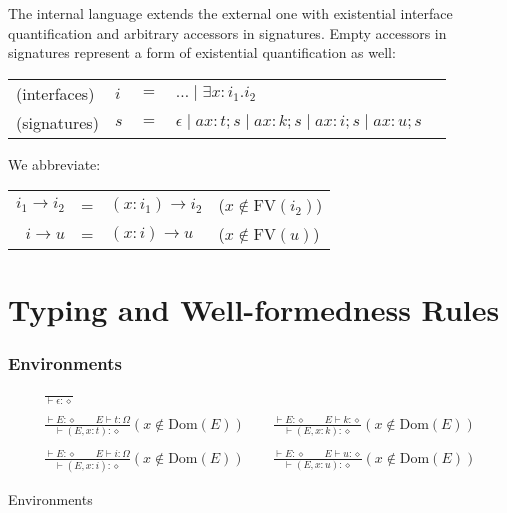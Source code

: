\documentclass[twoside]{article}
\newcommand{\f}[1]{\mbox{#1}}
\begin{document}
The internal language extends the external one with existential interface quantification and arbitrary accessors in signatures. Empty accessors in signatures represent a form of existential quantification as well:

\begin{center}
\begin{tabular}{llcll}
(interfaces)	&$i$&$=$&	$\dots \;|\; \exists x:i_1.i_2$ \\
(signatures)	&$s$&$=$&	$\epsilon \;|\; ax:t;s \;|\; ax:k;s \;|\;
				ax:i;s \;|\; ax:u;s$ \\
\end{tabular}
\end{center}

We abbreviate:

\begin{center}
\begin{tabular}{rcll}
$i_1\to i_2$	&=&	$(x:i_1)\to i_2$	& ($x \notin \f{FV}(i_2)$) \\
$i\to u$	&=&	$(x:i)\to u$		& ($x \notin \f{FV}(u)$)
\end{tabular}
\end{center}


\section{Typing and Well-formedness Rules}
\label{typing}

\subsubsection*{Environments \hfill
{}
}

\begin{displaymath}
\begin{array}{c}
\displaystyle
\frac{}{
\vdash \epsilon : \diamond
}
\\\\\displaystyle
\frac{
\vdash E : \diamond
\qquad
E \vdash t : \Omega
}{
\vdash (E,x:t) : \diamond
}(x \notin \f{Dom}(E))
\qquad
\frac{
\vdash E : \diamond
\qquad
E \vdash k : \diamond
}{
\vdash (E,x:k) : \diamond
}(x \notin \f{Dom}(E))
\\\\\displaystyle
\frac{
\vdash E : \diamond
\qquad
E \vdash i : \Omega
}{
\vdash (E,x:i) : \diamond
}(x \notin \f{Dom}(E))
\qquad
\frac{
\vdash E : \diamond
\qquad
E \vdash u : \diamond
}{
\vdash (E,x:u) : \diamond
}(x \notin \f{Dom}(E))
\end{array}
\end{displaymath}
\begin{center}Environments\end{center}
\end{document}

